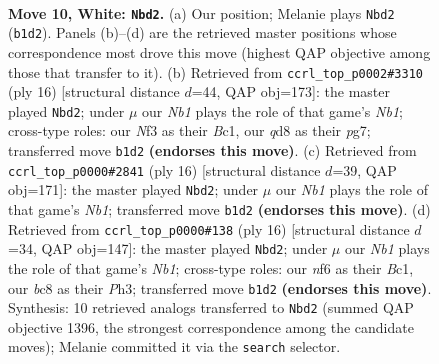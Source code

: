 \documentclass[11pt]{article}
\begin{document}
\clearpage

\begin{figure}[p]\centering
\begin{subfigure}{0.46\textwidth}\centering
\resizebox{\linewidth}{!}{%
\newchessgame
\chessboard[
  setfen={r1bq1rk1/1pp2p2/2np1np1/p1b1p2p/2B1P2P/2PP1N2/PP3PP1/RNBQR1K1 w - - 0 10},
  showmover=false,
  pgfstyle=straightmove, color=movearrow, markmove={b1-d2}
]}
\caption{}
\end{subfigure}\hfill
\begin{subfigure}{0.46\textwidth}\centering
\resizebox{\linewidth}{!}{%
\newchessgame
\chessboard[
  setfen={r1bq1rk1/1pp2pp1/p1np1n1p/2b1p3/2B1P3/2PP1N1P/PP3PP1/RNBQR1K1 w - - 0 9},
  showmover=false,
  pgfstyle=straightmove, color=movearrow, markmove={b1-d2}
]}
\caption{}
\end{subfigure}
\\[4pt]
\begin{subfigure}{0.46\textwidth}\centering
\resizebox{\linewidth}{!}{%
\newchessgame
\chessboard[
  setfen={r1bq1rk1/1pp2pp1/p1np1n1p/2b1p3/P1B1P3/2PP1N2/1P3PPP/RNBQR1K1 w - - 2 9},
  showmover=false,
  pgfstyle=straightmove, color=movearrow, markmove={b1-d2}
]}
\caption{}
\end{subfigure}\hfill
\begin{subfigure}{0.46\textwidth}\centering
\resizebox{\linewidth}{!}{%
\newchessgame
\chessboard[
  setfen={r1bq1rk1/ppp2pp1/1bnp1n1p/4p3/2B1P3/2PP1N1P/PP3PP1/RNBQR1K1 w - - 0 9},
  showmover=false,
  pgfstyle=straightmove, color=movearrow, markmove={b1-d2}
]}
\caption{}
\end{subfigure}
\caption{\textbf{Move 10, White: \texttt{Nbd2}.} (a) Our position; Melanie plays \texttt{Nbd2} (\texttt{b1d2}). Panels (b)--(d) are the retrieved master positions whose correspondence most drove this move (highest QAP objective among those that transfer to it). (b) Retrieved from \texttt{ccrl\_top\_p0002\#3310} (ply 16) [structural distance $d$=44, QAP obj=173]: the master played \texttt{Nbd2}; under $\mu$ our \emph{Nb1} plays the role of that game's \emph{Nb1}; cross-type roles: our \emph{N}f3 as their \emph{B}c1, our \emph{q}d8 as their \emph{p}g7; transferred move \texttt{b1d2} \textbf{(endorses this move)}. (c) Retrieved from \texttt{ccrl\_top\_p0000\#2841} (ply 16) [structural distance $d$=39, QAP obj=171]: the master played \texttt{Nbd2}; under $\mu$ our \emph{Nb1} plays the role of that game's \emph{Nb1}; transferred move \texttt{b1d2} \textbf{(endorses this move)}. (d) Retrieved from \texttt{ccrl\_top\_p0000\#138} (ply 16) [structural distance $d$=34, QAP obj=147]: the master played \texttt{Nbd2}; under $\mu$ our \emph{Nb1} plays the role of that game's \emph{Nb1}; cross-type roles: our \emph{n}f6 as their \emph{B}c1, our \emph{b}c8 as their \emph{P}h3; transferred move \texttt{b1d2} \textbf{(endorses this move)}. Synthesis: 10 retrieved analogs transferred to \texttt{Nbd2} (summed QAP objective 1396, the strongest correspondence among the candidate moves); Melanie committed it via the \texttt{search} selector.}
\label{fig:thought-m18}
\end{figure}
\end{document}
